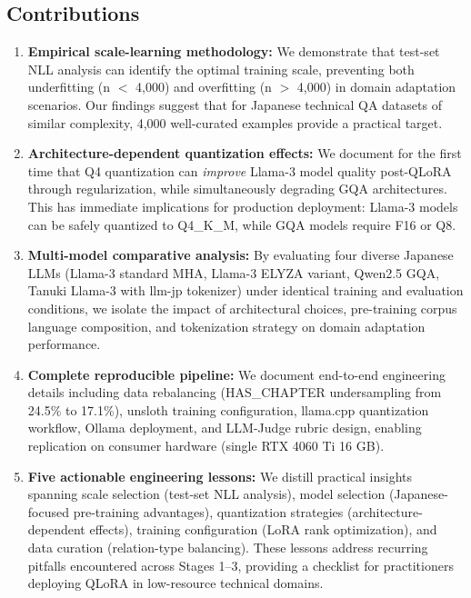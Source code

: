 \documentclass[twocolumn]{article}
\begin{document}
\subsection{Contributions}

\begin{enumerate}
  \item \textbf{Empirical scale-learning methodology:} We demonstrate that test-set NLL
        analysis can identify the optimal training scale, preventing both underfitting
        (n $<$ 4,000) and overfitting (n $>$ 4,000) in domain adaptation scenarios.
        Our findings suggest that for Japanese technical QA datasets of similar complexity,
        4,000 well-curated examples provide a practical target.
  \item \textbf{Architecture-dependent quantization effects:} We document for the first time
        that Q4 quantization can \emph{improve} Llama-3 model quality post-QLoRA through
        regularization, while simultaneously degrading GQA architectures.
        This has immediate implications for production deployment: Llama-3 models can be
        safely quantized to Q4\_K\_M, while GQA models require F16 or Q8.
  \item \textbf{Multi-model comparative analysis:} By evaluating four diverse Japanese LLMs
        (Llama-3 standard MHA, Llama-3 ELYZA variant, Qwen2.5 GQA, Tanuki Llama-3 with llm-jp tokenizer)
        under identical training and evaluation conditions, we isolate the impact of
        architectural choices, pre-training corpus language composition, and tokenization
        strategy on domain adaptation performance.
  \item \textbf{Complete reproducible pipeline:} We document end-to-end engineering details
        including data rebalancing (HAS\_CHAPTER undersampling from 24.5\% to 17.1\%),
        unsloth training configuration, llama.cpp quantization workflow, Ollama deployment,
        and LLM-Judge rubric design, enabling replication on consumer hardware
        (single RTX 4060 Ti 16 GB).
  \item \textbf{Five actionable engineering lessons:} We distill practical insights
        spanning scale selection (test-set NLL analysis), model selection (Japanese-focused
        pre-training advantages), quantization strategies (architecture-dependent effects),
        training configuration (LoRA rank optimization), and data curation (relation-type
        balancing). These lessons address recurring pitfalls encountered across
        Stages 1--3, providing a checklist for practitioners deploying QLoRA in
        low-resource technical domains.
\end{enumerate}
\end{document}
